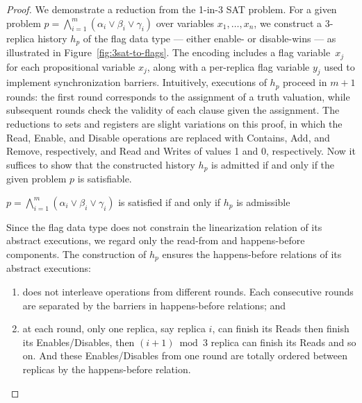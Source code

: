 \begin{proof}

  We demonstrate a reduction from the 1-in-3 SAT problem. For a given problem $p = \bigwedge_{i=1}^{m} (\alpha_i \lor \beta_i \lor \gamma_i)$ over variables $x_1, \ldots, x_n$, we construct a 3-replica history $h_p$ of the flag data type — either enable- or disable-wins — as illustrated in Figure~\ref{fig:3sat-to-flags}. The encoding includes a flag variable~$x_j$ for each propositional variable $x_j$, along with a per-replica flag variable $y_j$ used to implement synchronization barriers. Intuitively, executions of $h_p$ proceed in $m+1$ rounds: the first round corresponds to the assignment of a truth valuation, while subsequent rounds check the validity of each clause given the assignment. The reductions to sets and registers are slight variations on this proof, in which the \textrm{Read}, \textrm{Enable}, and \textrm{Disable} operations are replaced with \textrm{Contains}, \textrm{Add}, and \textrm{Remove}, respectively, and \textrm{Read} and \textrm{Writes} of values 1 and 0, respectively. Now it suffices to show that the constructed history $h_p$ is admitted if and only if the given problem $p$ is satisfiable.
  
  \begin{lemma}
    \label{crdt:flag:npc-proof:lemma3}
    $p = \bigwedge_{i=1}^{m} (\alpha_i \lor \beta_i \lor \gamma_i)$ is satisfied if and only if $h_p$ is admissible
  \end{lemma}
  
  Since the flag data type does not constrain the linearization relation of its abstract executions, we regard only the read-from and happens-before components. The construction of $h_p$ ensures the happens-before relations of its abstract executions:
  \vspace{-1.5mm}
  \begin{enumerate}

    \item does not interleave operations from different rounds. Each consecutive rounds are separated by the barriers in happens-before relations; and

    \item at each round, only one replica, say replica $i$, can finish its \textrm{Read}s then finish its \textrm{Enable}s/\textrm{Disable}s, then $(i+1) \bmod 3$ replica can finish its \textrm{Read}s and so on. And these \textrm{Enable}s/\textrm{Disable}s from one round are totally ordered between replicas by the happens-before relation.


\end{enumerate}
\end{proof}
